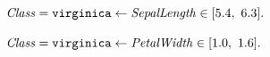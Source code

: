\documentclass[presentation]{beamer}\mode<presentation>{\usetheme{blackAMSBolognaFC}}
\begin{document}
\begin{frame}[allowframebreaks]
\begin{columns}
\begin{column}{.55\linewidth}
\[\begin{array}{l}
                \\
                \\
                \mathit{Class} = \mathtt{virginica} \leftarrow \mathit{SepalLength} \in [5.4,\ 6.3] \mathtt{.}
                \\
                \\
                \mathit{Class} = \mathtt{virginica} \leftarrow \mathit{PetalWidth} \in [1.0,\ 1.6] \mathtt{.}
                \\
                \\
            \end{array}    
            \]
        \end{column}
        \hfill
    \end{columns}

\end{frame}
\end{document}
